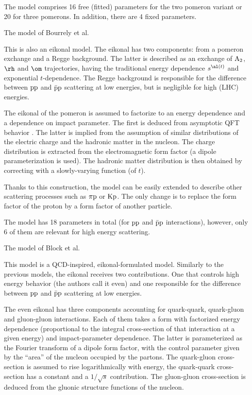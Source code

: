 The model comprises 16 free (fitted) parameters for the two pomeron variant or 20 for three pomerons. In addition, there are 4 fixed parameters.

\caption{The model of Bourrely et al. }

This is also an eikonal model. The eikonal has two components: from a pomeron exchange and a Regge background. The latter is described as an exchange of $\rm A_2$, $\rm \rh$ and $\rm \om$ trajectories, having the traditional energy dependence $s^{\al(t)}$ and exponential $t$-dependence. The Regge background is responsible for the difference between $\rm pp$ and $\rm\bar pp$ scattering at low energies, but is negligible for high (LHC) energies.

The eikonal of the pomeron is assumed to factorize to an energy dependence and a dependence on impact parameter. The first is deduced from asymptotic QFT behavior . The latter is implied from the assumption of similar distributions of the electric charge and the hadronic matter in the nucleon. The charge distribution is extracted from the electromagnetic form factor (a dipole parameterization is used). The hadronic matter distribution is then obtained by correcting with a slowly-varying function (of $t$).

Thanks to this construction, the model can be easily extended to describe other scattering processes such as $\rm \pi p$ or $\rm Kp$. The only change is to replace the form factor of the proton by a form factor of another particle.

The model has 18 parameters in total (for $\rm pp$ and $\rm \bar p p$ interactions), however, only 6 of them are relevant for high energy scattering.

\caption{The model of Block et al. }

This model is a QCD-inspired, eikonal-formulated model. Similarly to the previous models, the eikonal receives two contributions. One that controls high energy behavior (the authors call it even) and one responsible for the difference between $\rm pp$ and $\rm\bar pp$ scattering at low energies.

The even eikonal has three components accounting for quark-quark, quark-gluon and gluon-gluon interactions. Each of them takes a form with factorized energy dependence (proportional to the integral cross-section of that interaction at a given energy) and impact-parameter dependence. The latter is parameterized as the Fourier transform of a dipole form factor, with the control parameter given by the ``area'' of the nucleon occupied by the partons. The quark-gluon cross-section is assumed to rise logarithmically with energy, the quark-quark cross-section has a constant and a $1/\sqrt s$ contribution. The gluon-gluon cross-section is deduced from the gluonic structure functions of the nucleon.

